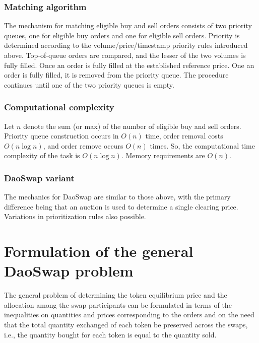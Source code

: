 \documentclass[11pt, reqno]{amsart}
\theoremstyle{definition}
\theoremstyle{remark}
\begin{document}
\subsubsection{Matching algorithm}
The mechanism for matching eligible buy and sell orders consists of two
priority queues, one for eligible buy orders and one for eligible sell orders.
Priority is determined according to the volume/price/timestamp priority rules
introduced above. Top-of-queue orders are compared, and the lesser of the two
volumes is fully filled. Once an order is fully filled at the established
reference price. One an order is fully filled, it is removed from the priority
queue. The procedure continues until one of the two priority queues is empty.

\subsubsection{Computational complexity}
Let $n$ denote the sum (or max) of the number of eligible buy and sell orders.
Priority queue construction occurs in $O(n)$ time, order removal costs
$O(n \log n)$, and order remove occurs $O(n)$ times. So, the computational
time complexity of the task is $O(n \log n)$. Memory requirements are $O(n)$.

\subsubsection{DaoSwap variant}
The mechanics for DaoSwap are similar to those above, with the primary
difference being that an auction is used to determine a single clearing price.
Variations in prioritization rules also possible.


\section{Formulation of the general DaoSwap problem}
The general problem of determining the token equilibrium price and the
allocation among the swap participants can be formulated in terms of the
inequalities on quantities and prices corresponding to the orders and on the
need that the total quantity exchanged of each token be preserved across the
swaps, i.e., the quantity bought for each token is equal to the quantity sold.
\end{document}
